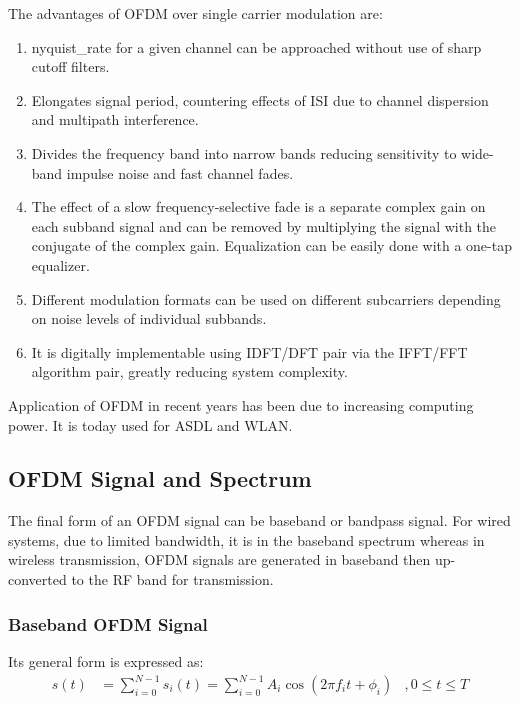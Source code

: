 \noindent The advantages of \gls{OFDM} over single carrier modulation are:
\begin{enumerate}
	\item \gls{nyquist_rate} for a given channel can be approached without use of sharp cutoff filters.
	\item Elongates signal period, countering effects of \gls{ISI} due to channel dispersion and multipath interference.
	\item Divides the frequency band into narrow bands reducing sensitivity to wide-band impulse noise and fast channel fades.
	\item The effect of a slow frequency-selective fade is a separate complex gain on each \gls{subband} signal and can be removed by multiplying the signal with the conjugate of the complex gain. Equalization can be easily done with a one-tap equalizer.
	\item Different modulation formats can be used on different \gls{subcarrier}s depending on noise levels of individual \gls{subband}s.
	\item It is digitally implementable using \gls{IDFT}/\gls{DFT} pair via the \gls{IFFT}/\gls{FFT} algorithm pair, greatly reducing system complexity.
\end{enumerate}
Application of \gls{OFDM} in recent years has been due to increasing computing power. It is today used for \gls{ASDL} and \gls{WLAN}.

\subsection{OFDM Signal and Spectrum}
The final form of an OFDM signal can be baseband or bandpass signal. For wired systems, due to limited bandwidth, it is in the baseband spectrum whereas in wireless transmission, \gls{OFDM} signals are generated in baseband then up-converted to the \gls{RF} band for transmission.

\subsubsection{Baseband OFDM Signal}
Its general form is expressed as:
\begin{align*}
s(t) &= \sum_{i=0}^{N-1}s_i(t) = \sum_{i=0}^{N-1}A_i\cos\left( 2\pi f_it + \phi_i\right)&, 0\leq t\leq T
\end{align*}


